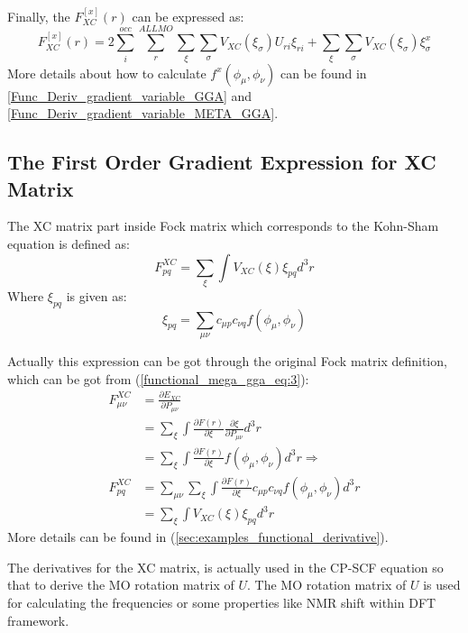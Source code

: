Finally, the $F^{[x]}_{XC}(r)$ can be expressed as:
\begin{equation}
 F^{[x]}_{XC}(r) =  2\sum_{i}^{occ}\sum_{r}^{ALL MO}\sum_{\xi}\sum_{\sigma}
V_{XC}(\xi_{\sigma})U_{ri}\xi_{ri} + \sum_{\xi}\sum_{\sigma}
V_{XC}(\xi_{\sigma})\xi_{\sigma}^{x}
\end{equation}
More details about how to calculate $f^{x}(\phi_{\mu}, \phi_{\nu})$ can
be found in \ref{Func_Deriv_gradient_variable_GGA}
and \ref{Func_Deriv_gradient_variable_META_GGA}.


\subsection{The First Order Gradient Expression for XC Matrix}
%
%
%
%
The XC matrix part inside Fock matrix which corresponds to the Kohn-Sham
equation is defined as:
\begin{equation}
F^{XC}_{pq} = \sum_{\xi}\int  V_{XC}(\xi) \xi_{pq} d^{3}r
\label{NUM_AO_INT_gradient_fock_eq:1} 
\end{equation}
Where $ \xi_{pq}$ is given as:
\begin{equation}
 \xi_{pq} = \sum_{\mu\nu}c_{\mu p}c_{\nu q}f(\phi_{\mu},\phi_{\nu})
\end{equation}

Actually this expression can be got through the original Fock matrix
definition, which can be got from (\ref{functional_mega_gga_eq:3}):
\begin{align}
\label{NUM_AO_INT_gradient_fock_eq:2}
F^{XC}_{\mu\nu}  &= \frac{\partial E_{XC}}{\partial P_{\mu\nu}} \nonumber \\
&= \sum_{\xi}\int \frac{\partial F(r)}{\partial
\xi} \frac{\partial \xi}{\partial P_{\mu\nu}} d^{3}r  \nonumber \\
&= \sum_{\xi}\int \frac{\partial F(r)}{\partial
\xi} f(\phi_{\mu},\phi_{\nu}) d^{3}r 
\Rightarrow \nonumber \\
F^{XC}_{pq}   &= \sum_{\mu\nu}\sum_{\xi}\int \frac{\partial F(r)}{\partial
\xi} c_{\mu p}c_{\nu q} f(\phi_{\mu},\phi_{\nu}) d^{3}r  \nonumber \\
&= \sum_{\xi}\int  V_{XC}(\xi) \xi_{pq} d^{3}r
\end{align}
More details can be found in (\ref{sec:examples_functional_derivative}). 

The derivatives for the XC matrix, is actually used in the CP-SCF equation so
that to derive the MO rotation matrix of $U$. The MO rotation matrix of $U$ is
used for calculating the frequencies or some properties like NMR shift within
DFT framework.

